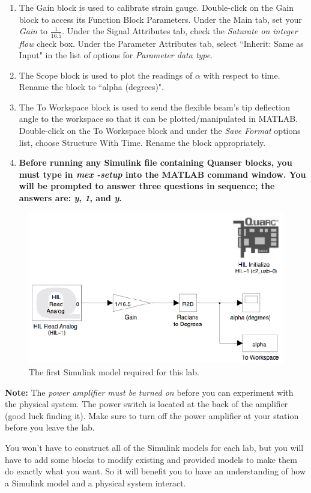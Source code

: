 \documentclass[12pt]{report}
\begin{document}
\begin{enumerate}
    \item The Gain block is used to calibrate strain gauge. Double-click on the Gain block to access its Function Block Parameters. Under the Main tab, set your \emph{Gain} to $\frac{1}{16.5}$. Under the Signal Attributes tab, check the \emph{Saturate on integer flow} check box. Under the Parameter Attributes tab, select ``Inherit: Same as Input" in the list of options for \emph{Parameter data type}.
    \item The Scope block is used to plot the readings of $\alpha$ with respect to time. Rename the block to ``alpha (degrees)".
    \item The To Workspace block is used to send the flexible beam's tip deflection angle to the workspace so that it can be plotted/manipulated in MATLAB. Double-click on the To Workspace block and under the \emph{Save Format} options list, choose Structure With Time. Rename the block appropriately.
    \item \textbf{Before running any Simulink file containing Quanser blocks, you must type in \emph{mex -setup} into the MATLAB command window. You will be prompted to answer three questions in sequence; the answers are: \emph{y}, \emph{1}, and \emph{y}.}
\end{enumerate}
\begin{figure}[htb!]
    \centering
    \includegraphics[width=.7\linewidth]{eps/lab_1/first_model.eps}
    \caption{The first Simulink model required for this lab.}
    \label{fig:lab1_firstmodel}
\end{figure}

\textbf{Note:} The \emph{power amplifier must be turned on} before you can experiment with the physical system. The power switch is located at the back of the amplifier (good luck finding it). Make sure to turn off the power amplifier at your station before you leave the lab.

You won't have to construct all of the Simulink models for each lab, but you will have to add some blocks to modify existing and provided models to make them do exactly what you want. So it will benefit you to have an understanding of how a Simulink model and a physical system interact.
\end{document}
